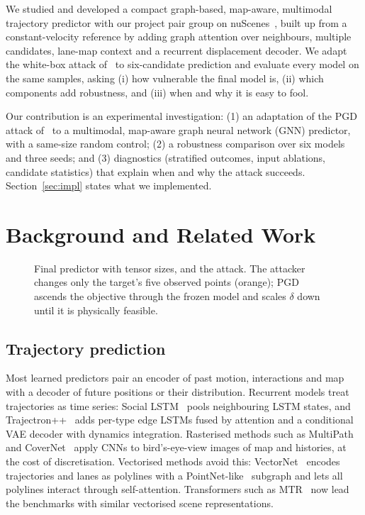 \documentclass[conference]{IEEEtran}
\begin{document}
We studied and developed a compact graph-based, map-aware, multimodal trajectory predictor with our project pair group on nuScenes~\cite{caesar2020nuscenes}, built up from a constant-velocity reference by adding graph attention over neighbours, multiple candidates, lane-map context and a recurrent displacement decoder. We adapt the white-box attack of~\cite{zhang2022adversarial} to six-candidate prediction and evaluate every model on the same samples, asking (i) how vulnerable the final model is, (ii) which components add robustness, and (iii) when and why it is easy to fool.

Our contribution is an experimental investigation: (1) an adaptation of the PGD attack of~\cite{zhang2022adversarial} to a multimodal, map-aware graph neural network (GNN) predictor, with a same-size random control; (2) a robustness comparison over six models and three seeds; and (3) diagnostics (stratified outcomes, input ablations, candidate statistics) that explain when and why the attack succeeds. Section~\ref{sec:impl} states what we implemented.

\section{Background and Related Work}
\begin{figure}[t]
\centering

\caption{Final predictor with tensor sizes, and the attack. The attacker changes only the target's five observed points (orange); PGD ascends the objective through the frozen model and scales $\delta$ down until it is physically feasible.}
\label{fig:architecture}
\end{figure}

\subsection{Trajectory prediction}
Most learned predictors pair an encoder of past motion, interactions and map with a decoder of future positions or their distribution. Recurrent models treat trajectories as time series: Social LSTM~\cite{alahi2016social} pools neighbouring LSTM states, and Trajectron++~\cite{salzmann2020trajectron} adds per-type edge LSTMs fused by attention and a conditional VAE decoder with dynamics integration. Rasterised methods such as MultiPath~\cite{chai2019multipath} and CoverNet~\cite{phanminh2020covernet} apply CNNs to bird's-eye-view images of map and histories, at the cost of discretisation. Vectorised methods avoid this: VectorNet~\cite{gao2020vectornet} encodes trajectories and lanes as polylines with a PointNet-like~\cite{qi2017pointnet} subgraph and lets all polylines interact through self-attention. Transformers such as MTR~\cite{shi2022mtr} now lead the benchmarks with similar vectorised scene representations.
\end{document}
